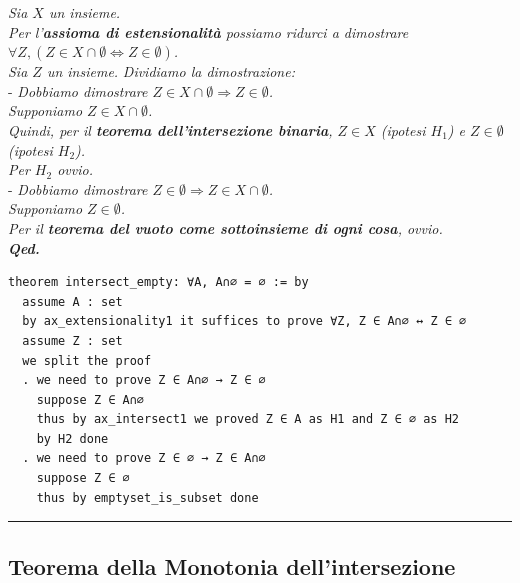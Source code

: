\documentclass[
  a4paper,
]{article}
\begin{document}
\begin{examplebox}[Dimostrazione]

\emph{Sia \(X\) un insieme.}\\
\emph{Per l'\textbf{assioma di estensionalità} possiamo ridurci a
dimostrare
\(\forall Z , (Z \in X \cap \emptyset \Leftrightarrow Z \in \emptyset)\).}\\
\emph{Sia \(Z\) un insieme.} \emph{Dividiamo la dimostrazione:}\\
- \emph{Dobbiamo dimostrare
\(Z \in X \cap \emptyset \Rightarrow Z \in \emptyset\).}\\
\emph{Supponiamo \(Z \in X \cap \emptyset\).}\\
\emph{Quindi, per il \textbf{teorema dell'intersezione binaria},
\(Z \in X\) (ipotesi \(H_1\)) e \(Z \in \emptyset\) (ipotesi
\(H_2\)).}\\
\emph{Per \(H_2\) ovvio.}\\
- \emph{Dobbiamo dimostrare
\(Z \in \emptyset \Rightarrow Z \in X \cap \emptyset\).}\\
\emph{Supponiamo \(Z \in \emptyset\).}\\
\emph{Per il \textbf{teorema del vuoto come sottoinsieme di ogni cosa},
ovvio.}\\
\textbf{\emph{Qed.}}

\end{examplebox}

\begin{examplebox}

\begin{lstlisting}
theorem intersect_empty: ∀A, A∩∅ = ∅ := by
  assume A : set
  by ax_extensionality1 it suffices to prove ∀Z, Z ∈ A∩∅ ↔ Z ∈ ∅ 
  assume Z : set
  we split the proof
  . we need to prove Z ∈ A∩∅ → Z ∈ ∅
    suppose Z ∈ A∩∅ 
    thus by ax_intersect1 we proved Z ∈ A as H1 and Z ∈ ∅ as H2
    by H2 done
  . we need to prove Z ∈ ∅ → Z ∈ A∩∅
    suppose Z ∈ ∅
    thus by emptyset_is_subset done 
\end{lstlisting}

\end{examplebox}

\par\noindent\rule{\linewidth}{0.4pt}\par\vspace{6pt}

\hypertarget{teorema-della-monotonia-dellintersezione}{%
\subsection{Teorema della Monotonia
dell'intersezione}\label{teorema-della-monotonia-dellintersezione}}
\end{document}
